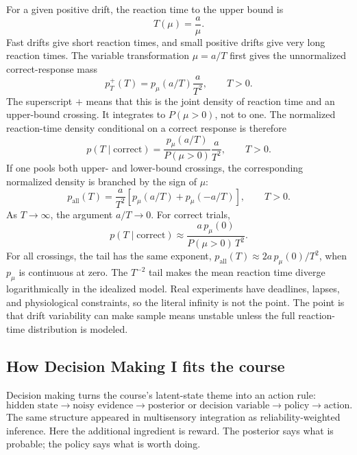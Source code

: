 For a given positive drift, the reaction time to the upper bound is
\[
  T(\mu)=\frac{a}{\mu}.
\]
Fast drifts give short reaction times, and small positive drifts give very long reaction times. The variable transformation \(\mu=a/T\) first gives the unnormalized correct-response mass
\[
  p_T^{+}(T)
  =
  p_\mu(a/T)\frac{a}{T^2},
  \qquad
  T>0.
\]
The superscript \(+\) means that this is the joint density of reaction time and an upper-bound crossing. It integrates to \(P(\mu>0)\), not to one. The normalized reaction-time density conditional on a correct response is therefore
\[
  p(T\mid \mathrm{correct})
  =
  \frac{p_\mu(a/T)}{P(\mu>0)}\frac{a}{T^2},
  \qquad
  T>0.
\]
If one pools both upper- and lower-bound crossings, the corresponding normalized density is branched by the sign of \(\mu\):
\[
  p_{\mathrm{all}}(T)
  =
  \frac{a}{T^2}
  \left[
    p_\mu(a/T)+p_\mu(-a/T)
  \right],
  \qquad
  T>0.
\]
As \(T\to\infty\), the argument \(a/T\to 0\). For correct trials,
\[
  p(T\mid \mathrm{correct})
  \approx
  \frac{a\,p_\mu(0)}{P(\mu>0)\,T^2}.
\]
For all crossings, the tail has the same exponent, \(p_{\mathrm{all}}(T)\approx 2a\,p_\mu(0)/T^2\), when \(p_\mu\) is continuous at zero. The \(T^{-2}\) tail makes the mean reaction time diverge logarithmically in the idealized model. Real experiments have deadlines, lapses, and physiological constraints, so the literal infinity is not the point. The point is that drift variability can make sample means unstable unless the full reaction-time distribution is modeled.

\subsection{How Decision Making I fits the course}

Decision making turns the course's latent-state theme into an action rule:
\[
  \text{hidden state}
  \rightarrow
  \text{noisy evidence}
  \rightarrow
  \text{posterior or decision variable}
  \rightarrow
  \text{policy}
  \rightarrow
  \text{action}.
\]
The same structure appeared in multisensory integration as reliability-weighted inference. Here the additional ingredient is reward. The posterior says what is probable; the policy says what is worth doing.

